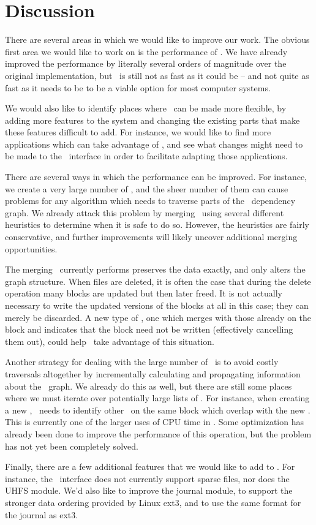 \section {Discussion}
\label{sec:discussion}

There are several areas in which we would like to improve our work. The obvious
first area we would like to work on is the performance of \Kudos. We have
already improved the performance by literally several orders of magnitude over
the original implementation, but \Kudos\ is still not as fast as it could be --
and not quite as fast as it needs to be to be a viable option for most computer
systems.

We would also like to identify places where \Kudos\ can be made more flexible,
by adding more features to the system and changing the existing parts that make
these features difficult to add. For instance, we would like to find more
applications which can take advantage of \opgroups, and see what changes might
need to be made to the \opgroup\ interface in order to facilitate adapting those
applications.

There are several ways in which the performance can be improved. For instance,
we create a very large number of \chdescs, and the sheer number of them can
cause problems for any algorithm which needs to traverse parts of the \chdesc\
dependency graph. We already attack this problem by merging \chdescs\ using
several different heuristics to determine when it is safe to do so. However, the
heuristics are fairly conservative, and further improvements will likely uncover
additional merging opportunities.

The merging \Kudos\ currently performs preserves the data exactly, and only
alters the graph structure. When files are deleted, it is often the case that
during the delete operation many blocks are updated but then later freed. It is
not actually necessary to write the updated versions of the blocks at all in
this case; they can merely be discarded. A new type of \chdesc, one which merges
with those already on the block and indicates that the block need not be written
(effectively cancelling them out), could help \Kudos\ take advantage of this
situation.

Another strategy for dealing with the large number of \chdescs\ is to avoid
costly traversals altogether by incrementally calculating and propagating
information about the \chdesc\ graph. We already do this as well, but there are
still some places where we must iterate over potentially large lists of
\chdescs. For instance, when creating a new \chdesc, \Kudos\ needs to identify
other \chdescs\ on the same block which overlap with the new \chdesc. This is
currently one of the larger uses of CPU time in \Kudos. Some optimization has
already been done to improve the performance of this operation, but the problem
has not yet been completely solved.

Finally, there are a few additional features that we would like to add to
\Kudos. For instance, the \LFS\ interface does not currently support sparse
files, nor does the UHFS module. We'd also like to improve the journal module,
to support the stronger data ordering provided by Linux ext3, and to use the
same format for the journal as ext3.
